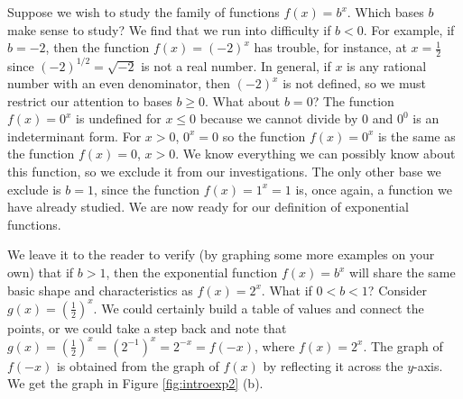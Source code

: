 Suppose we wish to study the family of functions $f(x) = b^{x}$.  Which bases $b$ make sense to study?  We find that we run into difficulty if $b < 0$.  For example, if $b = -2$, then the function $f(x) = (-2)^{x}$ has trouble, for instance, at $x = \frac{1}{2}$ since $(-2)^{1/2} = \sqrt{-2}$ is not a real number. In general, if $x$ is any rational number with an even denominator, then $(-2)^{x}$ is not defined, so we must restrict our attention to bases $b \geq 0$.  What about $b = 0$?  The function $f(x) = 0^{x}$ is undefined for $x \leq 0$ because we cannot divide by $0$ and $0^{0}$ is an indeterminant form.  For $x > 0$, $0^{x} = 0$ so the function  $f(x) = 0^{x}$ is the same as the function $f(x) = 0$, $x > 0$.  \label{indeterminantformtwo} We know everything we can possibly know about this function, so we exclude it from our investigations.  The only other base we exclude is $b=1$, since the function $f(x) = 1^{x} = 1$ is, once again, a function we have already studied.  We are now ready for our definition of exponential functions.

\smallskip



\smallskip

We leave it to the reader to verify (by graphing some more examples on your own) that if $b > 1$, then the exponential function $f(x) = b^{x}$ will share the same basic shape and characteristics as $f(x) = 2^{x}$.  What if $0 < b < 1$?  Consider $g(x) = \left(\frac{1}{2}\right)^{x}$.  We could certainly build a table of values and connect the points, or we could take a step back and note that $g(x) = \left(\frac{1}{2}\right)^{x} = \left(2^{-1}\right)^{x} = 2^{-x} = f(-x)$, where $f(x) = 2^{x}$.  The graph of $f(-x)$ is obtained from the graph of $f(x)$ by reflecting it across the $y$-axis. We get the graph in Figure \ref{fig:introexp2} (b).


